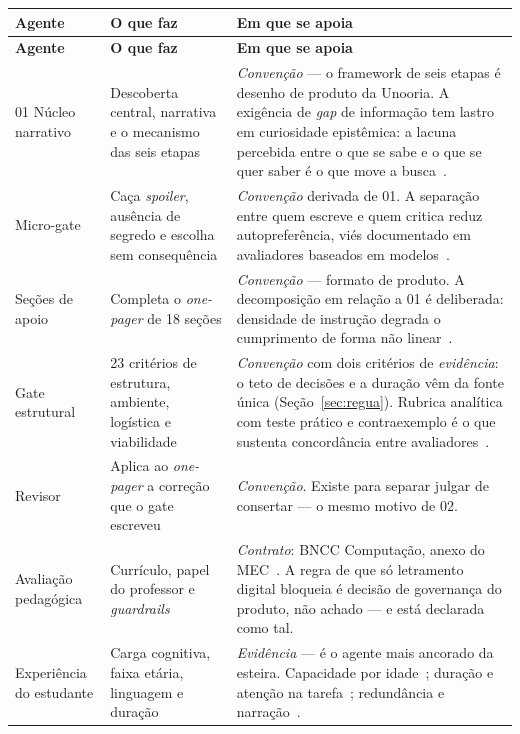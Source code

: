 \documentclass[11pt,a4paper]{article}
\begin{document}
\begin{center}
\begin{longtable}{p{2.5cm}p{5.4cm}p{6.6cm}}
\toprule
\textbf{Agente} & \textbf{O que faz} & \textbf{Em que se apoia} \\
\midrule
\endfirsthead
\toprule
\textbf{Agente} & \textbf{O que faz} & \textbf{Em que se apoia} \\
\midrule
\endhead
01 Núcleo narrativo & Descoberta central, narrativa e o mecanismo das seis etapas &
\textit{Convenção} --- o framework de seis etapas é desenho de produto da Unooria. A exigência de
\emph{gap} de informação tem lastro em curiosidade epistêmica: a lacuna percebida entre o que se
sabe e o que se quer saber é o que move a busca~\cite{loewenstein1994}. \\
\addlinespace
02 Micro-gate & Caça \emph{spoiler}, ausência de segredo e escolha sem consequência &
\textit{Convenção} derivada de 01. A separação entre quem escreve e quem critica reduz
autopreferência, viés documentado em avaliadores baseados em modelos~\cite{zheng2023b}. \\
\addlinespace
04 Seções de apoio & Completa o \emph{one-pager} de 18 seções &
\textit{Convenção} --- formato de produto. A decomposição em relação a 01 é deliberada: densidade
de instrução degrada o cumprimento de forma não linear~\cite{ifscale2025b}. \\
\addlinespace
05 Gate estrutural & 23 critérios de estrutura, ambiente, logística e viabilidade &
\textit{Convenção} com dois critérios de \textit{evidência}: o teto de decisões e a duração vêm da
fonte única (Seção~\ref{sec:regua}). Rubrica analítica com teste prático e contraexemplo é o que
sustenta concordância entre avaliadores~\cite{jonsson2007b}. \\
\addlinespace
07 Revisor & Aplica ao \emph{one-pager} a correção que o gate escreveu &
\textit{Convenção}. Existe para separar julgar de consertar --- o mesmo motivo de 02. \\
\addlinespace
08 Avaliação pedagógica & Currículo, papel do professor e \emph{guardrails} &
\textit{Contrato}: BNCC Computação, anexo do MEC~\cite{cne2022b}. A regra de que só letramento
digital bloqueia é decisão de governança do produto, não achado --- e está declarada como tal. \\
\addlinespace
09 Experiência do estudante & Carga cognitiva, faixa etária, linguagem e duração &
\textit{Evidência} --- é o agente mais ancorado da esteira. Capacidade por
idade~\cite{gathercole2004,cowan2016}; duração e atenção na
tarefa~\cite{godwin2016,betts2006}; redundância e narração~\cite{moreno2002,kalyuga2003}.

\end{longtable}
\end{center}
\end{document}
